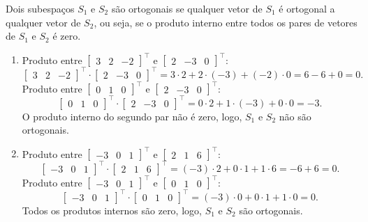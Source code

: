 \begin{resolution}
  Dois subespaços \( S_1 \) e \( S_2 \) são ortogonais se qualquer vetor de \( S_1 \) é ortogonal a qualquer vetor de \( S_2 \), ou seja, se o produto interno entre todos os pares de vetores de \( S_1 \) e \( S_2 \) é zero.

  \begin{enumerate}[label=\alph*)]
    \item Produto entre \(\begin{bmatrix} 3 & 2 & -2 \end{bmatrix}^{\top}\) e \(\begin{bmatrix} 2 & -3 & 0 \end{bmatrix}^{\top}\):
          \[
            \begin{bmatrix} 3 & 2 & -2 \end{bmatrix}^{\top} \cdot \begin{bmatrix} 2 & -3 & 0 \end{bmatrix}^{\top} = 3 \cdot 2 + 2 \cdot (-3) + (-2) \cdot 0 = 6 - 6 + 0 = 0.
          \]
          Produto entre \(\begin{bmatrix} 0 & 1 & 0 \end{bmatrix}^{\top}\) e \(\begin{bmatrix} 2 & -3 & 0 \end{bmatrix}^{\top}\):
          \[
            \begin{bmatrix} 0 & 1 & 0 \end{bmatrix}^{\top} \cdot \begin{bmatrix} 2 & -3 & 0 \end{bmatrix}^{\top} = 0 \cdot 2 + 1 \cdot (-3) + 0 \cdot 0 = -3.
          \]
          O produto interno do segundo par não é zero, logo, \( S_1 \) e \( S_2 \) não são ortogonais.
    \item Produto entre \(\begin{bmatrix} -3 & 0 & 1 \end{bmatrix}^{\top}\) e \(\begin{bmatrix} 2 & 1 & 6 \end{bmatrix}^{\top}\):
          \[
            \begin{bmatrix} -3 & 0 & 1 \end{bmatrix}^{\top} \cdot \begin{bmatrix} 2 & 1 & 6 \end{bmatrix}^{\top} = (-3) \cdot 2 + 0 \cdot 1 + 1 \cdot 6 = -6 + 6 = 0.
          \]
          Produto entre \(\begin{bmatrix} -3 & 0 & 1 \end{bmatrix}^{\top}\) e \(\begin{bmatrix} 0 & 1 & 0 \end{bmatrix}^{\top}\):
          \[
            \begin{bmatrix} -3 & 0 & 1 \end{bmatrix}^{\top} \cdot \begin{bmatrix} 0 & 1 & 0 \end{bmatrix}^{\top} = (-3) \cdot 0 + 0 \cdot 1 + 1 \cdot 0 = 0.
          \]
          Todos os produtos internos são zero, logo, \( S_1 \) e \( S_2 \) são ortogonais.


\end{enumerate}
\end{resolution}
